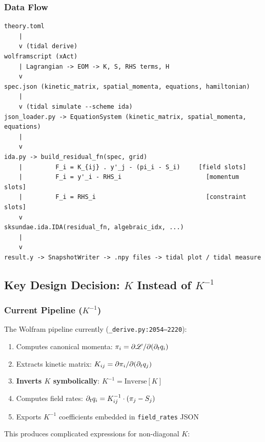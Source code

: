 \subsubsection{Data Flow}
\label{sec:data-flow}

\begin{lstlisting}[style=bash]
theory.toml
    |
    v (tidal derive)
wolframscript (xAct)
    | Lagrangian -> EOM -> K, S, RHS terms, H
    v
spec.json (kinetic_matrix, spatial_momenta, equations, hamiltonian)
    |
    v (tidal simulate --scheme ida)
json_loader.py -> EquationSystem (kinetic_matrix, spatial_momenta, equations)
    |
    v
ida.py -> build_residual_fn(spec, grid)
    |         F_i = K_{ij} . y'_j - (pi_i - S_i)     [field slots]
    |         F_i = y'_i - RHS_i                       [momentum slots]
    |         F_i = RHS_i                              [constraint slots]
    v
sksundae.ida.IDA(residual_fn, algebraic_idx, ...)
    |
    v
result.y -> SnapshotWriter -> .npy files -> tidal plot / tidal measure
\end{lstlisting}

\subsection{Key Design Decision: $K$ Instead of $K^{-1}$}
\label{sec:K-design}

\subsubsection{Current Pipeline ($K^{-1}$)}
\label{sec:old-pipeline}

The Wolfram pipeline currently (\texttt{\_derive.py:2054--2220}):

\begin{enumerate}
  \item Computes canonical momenta: $\pi_i = \partial\mathscr{L}/\partial(\partial_t q_i)$
  \item Extracts kinetic matrix: $K_{ij} = \partial\pi_i/\partial(\partial_t q_j)$
  \item \textbf{Inverts $K$ symbolically}: $K^{-1} = \mathrm{Inverse}[K]$
  \item Computes field rates: $\partial_t q_i = K^{-1}_{ij} \cdot (\pi_j - S_j)$
  \item Exports $K^{-1}$ coefficients embedded in \texttt{field\_rates} JSON
\end{enumerate}

This produces complicated expressions for non-diagonal $K$:

